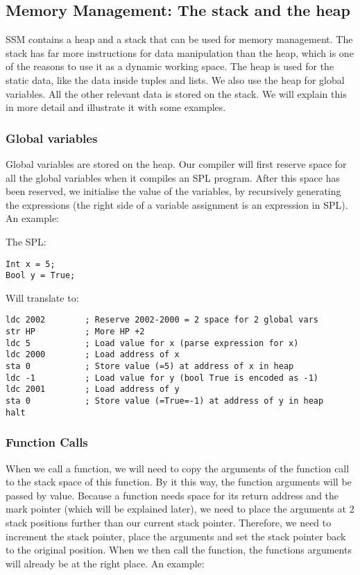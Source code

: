 \documentclass[a4paper]{article}
\begin{document}
\subsection{Memory Management: The stack and the heap}
SSM contains a heap and a stack that can be used for memory management. The stack has far more instructions for data manipulation than the heap, which is one of the reasons to use it as a dynamic working space. The heap is used for the static data, like the data inside tuples and lists. We also use the heap for global variables. All the other relevant data is stored on the stack. We will explain this in more detail and illustrate it with some examples. 

\subsubsection{Global variables}
Global variables are stored on the heap. Our compiler will first reserve space for all the global variables when it compiles an SPL program. After this space has been reserved, we initialise the value of the variables, by recursively generating the expressions (the right side of a variable assignment is an expression in SPL). An example:

The SPL:
\begin{lstlisting}
Int x = 5;
Bool y = True;
\end{lstlisting}
Will translate to:
\begin{lstlisting}
ldc 2002        ; Reserve 2002-2000 = 2 space for 2 global vars
str HP          ; More HP +2      
ldc 5           ; Load value for x (parse expression for x)
ldc 2000        ; Load address of x
sta 0           ; Store value (=5) at address of x in heap
ldc -1          ; Load value for y (bool True is encoded as -1)
ldc 2001        ; Load address of y
sta 0           ; Store value (=True=-1) at address of y in heap
halt            
\end{lstlisting}

\subsubsection{Function Calls}
When we call a function, we will need to copy the arguments of the function call to the stack space of this function. By it this way, the function arguments will be passed by value. Because a function needs space for its return address and the mark pointer (which will be explained later), we need to place the arguments at 2 stack positions further than our current stack pointer. Therefore, we need to increment the stack pointer, place the arguments and set the stack pointer back to the original position. When we then call the function, the functions arguments will already be at the right place. An example:
\end{document}
